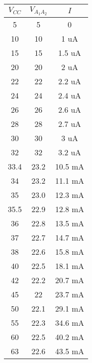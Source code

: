   \begin{table}[H] %
    \begin{center}
      \begin{tabular}{c|c|c}
        $V_{CC}$ &$V_{A_1A_2}$ &$I$  \\
        \hline
        5     &5    &0     \\
        10    &10   &1    uA\\
        15    &15   &1.5  uA\\
        20    &20   &2    uA\\
        22    &22   &2.2  uA\\
        24    &24   &2.4  uA\\
        26    &26   &2.6  uA\\
        28    &28   &2.7  uA\\
        30    &30   &3    uA\\
        32    &32   &3.2  uA\\
        33.4  &23.2 &10.5 mA\\
        34    &23.2 &11.1 mA\\
        35    &23.0 &12.3 mA\\
        35.5  &22.9 &12.8 mA\\
        36    &22.8 &13.5 mA\\
        37    &22.7 &14.7 mA\\
        38    &22.6 &15.8 mA\\
        40    &22.5 &18.1 mA\\
        42    &22.2 &20.7 mA\\
        45    &22   &23.7 mA \\
        50    &22.1 &29.1 mA \\
        55    &22.3 &34.6 mA \\
        60    &22.5 &40.2 mA \\
        63    &22.6 &43.5 mA \\
      \end{tabular}
    \end{center} 
  \end{table}

